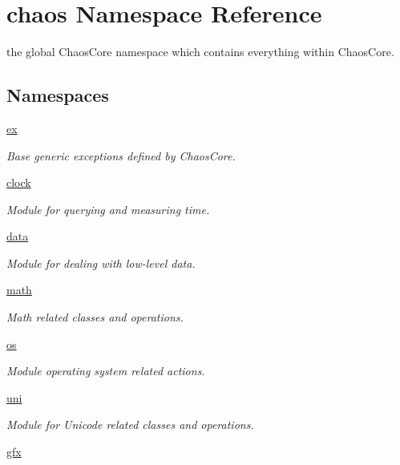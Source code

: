 \hypertarget{namespacechaos}{\section{chaos Namespace Reference}
\label{namespacechaos}
}


the global Chaos\-Core namespace which contains everything within Chaos\-Core.  


\subsection*{Namespaces}
\begin{DoxyCompactItemize}
\item 
\hyperlink{namespacechaos_1_1ex}{ex}
\begin{DoxyCompactList}\small\item\em Base generic exceptions defined by Chaos\-Core. \end{DoxyCompactList}\item 
\hyperlink{namespacechaos_1_1clock}{clock}
\begin{DoxyCompactList}\small\item\em Module for querying and measuring time. \end{DoxyCompactList}\item 
\hyperlink{namespacechaos_1_1data}{data}
\begin{DoxyCompactList}\small\item\em Module for dealing with low-\/level data. \end{DoxyCompactList}\item 
\hyperlink{namespacechaos_1_1math}{math}
\begin{DoxyCompactList}\small\item\em Math related classes and operations. \end{DoxyCompactList}\item 
\hyperlink{namespacechaos_1_1os}{os}
\begin{DoxyCompactList}\small\item\em Module operating system related actions. \end{DoxyCompactList}\item 
\hyperlink{namespacechaos_1_1uni}{uni}
\begin{DoxyCompactList}\small\item\em Module for Unicode related classes and operations. \end{DoxyCompactList}\item 
\hyperlink{namespacechaos_1_1gfx}{gfx}

\end{DoxyCompactItemize}
